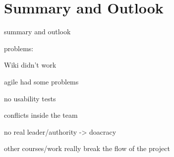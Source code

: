 \chapter{Summary and Outlook}\label{chap:summaryAndOutlook}

summary and outlook

problems:

Wiki didn't work

agile had some problems

no usability tests

conflicts inside the team

no real leader/authority -> doacracy

other courses/work really break the flow of the project